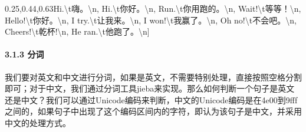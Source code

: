 \documentclass[
]{article}
\newenvironment{Shaded}{}{}
\newcommand{\CharTok}[1]{\textcolor[rgb]{0.25,0.44,0.63}{#1}}
\newcommand{\NormalTok}[1]{#1}
\newcommand{\StringTok}[1]{\textcolor[rgb]{0.25,0.44,0.63}{#1}}
\begin{document}
\begin{Shaded}
\begin{Highlighting}[]
\NormalTok{[}\StringTok{\textquotesingle{}Hi.}\CharTok{\textbackslash{}t}\StringTok{嗨。}\CharTok{\textbackslash{}n}\StringTok{\textquotesingle{}}\NormalTok{, }\StringTok{\textquotesingle{}Hi.}\CharTok{\textbackslash{}t}\StringTok{你好。}\CharTok{\textbackslash{}n}\StringTok{\textquotesingle{}}\NormalTok{, }\StringTok{\textquotesingle{}Run.}\CharTok{\textbackslash{}t}\StringTok{你用跑的。}\CharTok{\textbackslash{}n}\StringTok{\textquotesingle{}}\NormalTok{, }\StringTok{\textquotesingle{}Wait!}\CharTok{\textbackslash{}t}\StringTok{等等！}\CharTok{\textbackslash{}n}\StringTok{\textquotesingle{}}\NormalTok{, }\StringTok{\textquotesingle{}Hello!}\CharTok{\textbackslash{}t}\StringTok{你好。}\CharTok{\textbackslash{}n}\StringTok{\textquotesingle{}}\NormalTok{, }\StringTok{\textquotesingle{}I try.}\CharTok{\textbackslash{}t}\StringTok{让我来。}\CharTok{\textbackslash{}n}\StringTok{\textquotesingle{}}\NormalTok{, }\StringTok{\textquotesingle{}I won!}\CharTok{\textbackslash{}t}\StringTok{我赢了。}\CharTok{\textbackslash{}n}\StringTok{\textquotesingle{}}\NormalTok{, }\StringTok{\textquotesingle{}Oh no!}\CharTok{\textbackslash{}t}\StringTok{不会吧。}\CharTok{\textbackslash{}n}\StringTok{\textquotesingle{}}\NormalTok{, }\StringTok{\textquotesingle{}Cheers!}\CharTok{\textbackslash{}t}\StringTok{乾杯!}\CharTok{\textbackslash{}n}\StringTok{\textquotesingle{}}\NormalTok{, }\StringTok{\textquotesingle{}He ran.}\CharTok{\textbackslash{}t}\StringTok{他跑了。}\CharTok{\textbackslash{}n}\StringTok{\textquotesingle{}}\NormalTok{]}
\end{Highlighting}
\end{Shaded}

\hypertarget{header-n95}{%
\paragraph{3.1.3 分词}\label{header-n95}}

我们要对英文和中文进行分词，如果是英文，不需要特别处理，直接按照空格分割即可；对于中文，我们通过分词工具jieba来实现。那么如何判断一个句子是英文还是中文？我们可以通过Unicode编码来判断，中文的Unicode编码是在4e00到9fff之间的，如果句子中出现了这个编码区间内的字符，即认为该句子是中文，并采用中文的处理方式。
\end{document}
